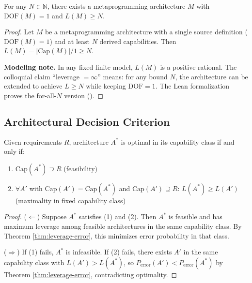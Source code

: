 \begin{theorem}\label{thm:metaprog}
For any $N \in \mathbb{N}$, there exists a metaprogramming architecture $M$ with $\text{DOF}(M) = 1$ and $L(M) \geq N$.
\end{theorem}

\begin{proof}
Let $M$ be a metaprogramming architecture with a single source definition ($\text{DOF}(M) = 1$) and at least $N$ derived capabilities. Then $L(M) = |\text{Cap}(M)|/1 \geq N$.

\textbf{Modeling note.} In any fixed finite model, $L(M)$ is a positive rational. The colloquial claim ``leverage $= \infty$'' means: for any bound $N$, the architecture can be extended to achieve $L \geq N$ while keeping $\text{DOF} = 1$. The Lean formalization proves the for-all-$N$ version ().
\end{proof}

\subsection{Architectural Decision Criterion}

\begin{theorem}\label{thm:optimal}
Given requirements $R$, architecture $A^*$ is optimal in its capability class if and only if:
\begin{enumerate}
\item $\text{Cap}(A^*) \supseteq R$ (feasibility)
\item $\forall A'$ with $\text{Cap}(A') = \text{Cap}(A^*)$ and $\text{Cap}(A') \supseteq R$: $L(A^*) \geq L(A')$ (maximality in fixed capability class)
\end{enumerate}
\end{theorem}

\begin{proof}
($\Leftarrow$) Suppose $A^*$ satisfies (1) and (2). Then $A^*$ is feasible and has maximum leverage among feasible architectures in the same capability class. By Theorem \ref{thm:leverage-error}, this minimizes error probability in that class.

($\Rightarrow$) If (1) fails, $A^*$ is infeasible. If (2) fails, there exists $A'$ in the same capability class with $L(A') > L(A^*)$, so $P_{\text{error}}(A') < P_{\text{error}}(A^*)$ by Theorem \ref{thm:leverage-error}, contradicting optimality.
\end{proof}

